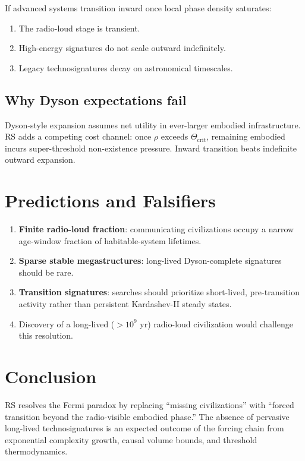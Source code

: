 \documentclass[12pt,a4paper]{article}
\theoremstyle{definition}
\theoremstyle{remark}
\begin{document}
If advanced systems transition inward once local phase density
saturates:
\begin{enumerate}
  \item The radio-loud stage is transient.
  \item High-energy signatures do not scale outward indefinitely.
  \item Legacy technosignatures decay on astronomical timescales.
\end{enumerate}

\subsection{Why Dyson expectations fail}

Dyson-style expansion assumes net utility in ever-larger embodied
infrastructure.  RS adds a competing cost channel: once $\rho$
exceeds $\Theta_{\mathrm{crit}}$, remaining embodied incurs
super-threshold non-existence pressure.  Inward transition beats
indefinite outward expansion.

\section{Predictions and Falsifiers}
\label{sec:predictions}

\begin{enumerate}
  \item \textbf{Finite radio-loud fraction}: communicating
  civilizations occupy a narrow age-window fraction of
  habitable-system lifetimes.
  \item \textbf{Sparse stable megastructures}: long-lived
  Dyson-complete signatures should be rare.
  \item \textbf{Transition signatures}: searches should prioritize
  short-lived, pre-transition activity rather than persistent
  Kardashev-II steady states.
  \item Discovery of a long-lived ($> 10^9$ yr) radio-loud
  civilization would challenge this resolution.
\end{enumerate}

\section{Conclusion}
\label{sec:conclusion}

RS resolves the Fermi paradox by replacing ``missing civilizations''
with ``forced transition beyond the radio-visible embodied phase.''
The absence of pervasive long-lived technosignatures is an expected
outcome of the forcing chain from exponential complexity growth,
causal volume bounds, and threshold thermodynamics.
\end{document}
